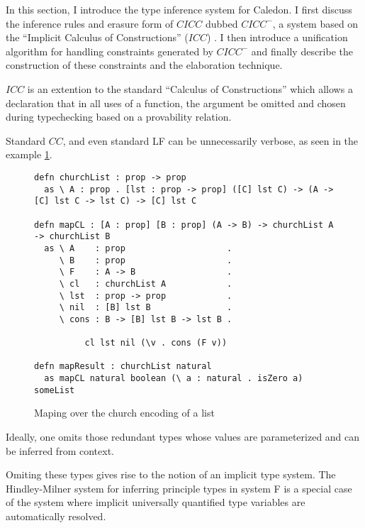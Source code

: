 In this section, I introduce the type inference system for Caledon. 
I first discuss the inference rules and 
erasure form of $CICC$ dubbed $CICC^-$, 
a system based on the ``Implicit Calculus of Constructions'' ($ICC$) \citep{pollack1990implicit}. 
I then introduce a unification algorithm for handling constraints generated by $CICC^-$ and finally 
describe the construction of these constraints and the elaboration technique.

$ICC$ is an extention to the standard ``Calculus of Constructions'' which allows
a declaration that in all uses of a function, the argument be omitted 
and chosen during typechecking based on a provability relation.

Standard $CC$, and even standard LF 
can be unnecessarily verbose, as seen in the example \ref{code:long}.

\begin{figure}[h]
\begin{lstlisting}
defn churchList : prop -> prop
  as \ A : prop . [lst : prop -> prop] ([C] lst C) -> (A -> [C] lst C -> lst C) -> [C] lst C

defn mapCL : [A : prop] [B : prop] (A -> B) -> churchList A -> churchList B
  as \ A    : prop                    . 
     \ B    : prop                    .
     \ F    : A -> B                  . 
     \ cl   : churchList A            .
     \ lst  : prop -> prop            .
     \ nil  : [B] lst B               .
     \ cons : B -> [B] lst B -> lst B .

          cl lst nil (\v . cons (F v))

defn mapResult : churchList natural
  as mapCL natural boolean (\ a : natural . isZero a) someList

\end{lstlisting}
\caption{Maping over the church encoding of a list}
\label{code:long}
\end{figure}

Ideally, one omits those redundant types whose values are parameterized 
and can be inferred from context. 

Omiting these types gives rise to the notion of an implicit type system.  
The Hindley-Milner \citep{hindley1969principal} system for inferring principle types in system F
is a special case of the system where implicit universally quantified type variables are automatically
resolved.
